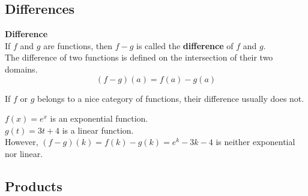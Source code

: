\documentclass{ximera}
\begin{document}
\subsection{Differences}



\begin{template}  \textbf{\textcolor{blue!55!black}{Difference}} \\


If  $f$ and $g$ are functions, then $f - g$ is called the \textbf{\textcolor{green!50!black}{difference}} of $f$ and $g$. \\

The difference of two functions is defined on the intersection of their two domains. \\


\[ (f - g)(a) = f(a) - g(a)  \]



\end{template}



\begin{warning}

If $f$ or $g$ belongs to a nice category of functions, their difference usually does not.

\end{warning}





\begin{example}

$f(x) = e^x$ is an exponential function. \\
$g(t) = 3 t + 4$ is a linear function. \\

However, $(f - g)(k) = f(k) - g(k) = e^k - 3 k - 4$ is neither exponential nor linear.

\end{example}
















\subsection{Products}
\end{document}
